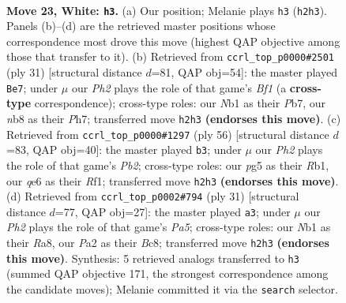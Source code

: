 \documentclass[11pt]{article}
\begin{document}
\clearpage

\begin{figure}[p]\centering
\begin{subfigure}{0.46\textwidth}\centering
\resizebox{\linewidth}{!}{%
\newchessgame
\chessboard[
  setfen={rnb1k1r1/8/4q3/p2p1pp1/1p1B3p/8/PPPQ1PPP/RN4KR w q - 0 23},
  showmover=false,
  pgfstyle=straightmove, color=movearrow, markmove={h2-h3}
]}
\caption{}
\end{subfigure}\hfill
\begin{subfigure}{0.46\textwidth}\centering
\resizebox{\linewidth}{!}{%
\newchessgame
\chessboard[
  setfen={3rkb1r/1p3ppp/p1n5/1q2Pp2/3p1P2/8/PPPN1BPP/R1QR2K1 b k - 7 16},
  showmover=false,
  pgfstyle=straightmove, color=movearrow, markmove={f8-e7}
]}
\caption{}
\end{subfigure}
\\[4pt]
\begin{subfigure}{0.46\textwidth}\centering
\resizebox{\linewidth}{!}{%
\newchessgame
\chessboard[
  setfen={1r5k/1q2r2p/1b2p1p1/p2pP3/B1p2PQP/2P5/1P4PK/1R3R2 w - - 3 29},
  showmover=false,
  pgfstyle=straightmove, color=movearrow, markmove={b2-b3}
]}
\caption{}
\end{subfigure}\hfill
\begin{subfigure}{0.46\textwidth}\centering
\resizebox{\linewidth}{!}{%
\newchessgame
\chessboard[
  setfen={r1b2rk1/1pp1q1pp/n7/4Pp2/p1P2P2/2Q1PN2/P5PP/2KR1B1R b - - 0 16},
  showmover=false,
  pgfstyle=straightmove, color=movearrow, markmove={a4-a3}
]}
\caption{}
\end{subfigure}
\caption{\textbf{Move 23, White: \texttt{h3}.} (a) Our position; Melanie plays \texttt{h3} (\texttt{h2h3}). Panels (b)--(d) are the retrieved master positions whose correspondence most drove this move (highest QAP objective among those that transfer to it). (b) Retrieved from \texttt{ccrl\_top\_p0000\#2501} (ply 31) [structural distance $d$=81, QAP obj=54]: the master played \texttt{Be7}; under $\mu$ our \emph{Ph2} plays the role of that game's \emph{Bf1} (a \textbf{cross-type} correspondence); cross-type roles: our \emph{N}b1 as their \emph{P}b7, our \emph{n}b8 as their \emph{P}h7; transferred move \texttt{h2h3} \textbf{(endorses this move)}. (c) Retrieved from \texttt{ccrl\_top\_p0000\#1297} (ply 56) [structural distance $d$=83, QAP obj=40]: the master played \texttt{b3}; under $\mu$ our \emph{Ph2} plays the role of that game's \emph{Pb2}; cross-type roles: our \emph{p}g5 as their \emph{R}b1, our \emph{q}e6 as their \emph{R}f1; transferred move \texttt{h2h3} \textbf{(endorses this move)}. (d) Retrieved from \texttt{ccrl\_top\_p0002\#794} (ply 31) [structural distance $d$=77, QAP obj=27]: the master played \texttt{a3}; under $\mu$ our \emph{Ph2} plays the role of that game's \emph{Pa5}; cross-type roles: our \emph{N}b1 as their \emph{R}a8, our \emph{P}a2 as their \emph{B}c8; transferred move \texttt{h2h3} \textbf{(endorses this move)}. Synthesis: 5 retrieved analogs transferred to \texttt{h3} (summed QAP objective 171, the strongest correspondence among the candidate moves); Melanie committed it via the \texttt{search} selector.}
\label{fig:thought-m44}
\end{figure}
\end{document}
